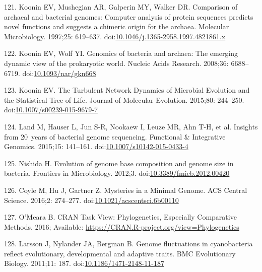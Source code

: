 \documentclass[12pt,twoside]{reedthesis}
\begin{document}
  \hypertarget{ref-kooninux5fcomparisonux5f1997}{}
  121. Koonin EV, Mushegian AR, Galperin MY, Walker DR. Comparison of
  archaeal and bacterial genomes: Computer analysis of protein sequences
  predicts novel functions and suggests a chimeric origin for the archaea.
  Molecular Microbiology. 1997;25: 619--637.
  doi:\href{https://doi.org/10.1046/j.1365-2958.1997.4821861.x}{10.1046/j.1365-2958.1997.4821861.x}
  
  \hypertarget{ref-kooninux5fgenomicsux5f2008}{}
  122. Koonin EV, Wolf YI. Genomics of bacteria and archaea: The emerging
  dynamic view of the prokaryotic world. Nucleic Acids Research. 2008;36:
  6688--6719.
  doi:\href{https://doi.org/10.1093/nar/gkn668}{10.1093/nar/gkn668}
  
  \hypertarget{ref-kooninux5fturbulentux5f2015}{}
  123. Koonin EV. The Turbulent Network Dynamics of Microbial Evolution
  and the Statistical Tree of Life. Journal of Molecular Evolution.
  2015;80: 244--250.
  doi:\href{https://doi.org/10.1007/s00239-015-9679-7}{10.1007/s00239-015-9679-7}
  
  \hypertarget{ref-landux5finsightsux5f2015}{}
  124. Land M, Hauser L, Jun S-R, Nookaew I, Leuze MR, Ahn T-H, et al.
  Insights from 20~years of bacterial genome sequencing. Functional \&
  Integrative Genomics. 2015;15: 141--161.
  doi:\href{https://doi.org/10.1007/s10142-015-0433-4}{10.1007/s10142-015-0433-4}
  
  \hypertarget{ref-nishidaux5fevolutionux5f2012}{}
  125. Nishida H. Evolution of genome base composition and genome size in
  bacteria. Frontiers in Microbiology. 2012;3.
  doi:\href{https://doi.org/10.3389/fmicb.2012.00420}{10.3389/fmicb.2012.00420}
  
  \hypertarget{ref-coyleux5fmysteriesux5f2016}{}
  126. Coyle M, Hu J, Gartner Z. Mysteries in a Minimal Genome. ACS
  Central Science. 2016;2: 274--277.
  doi:\href{https://doi.org/10.1021/acscentsci.6b00110}{10.1021/acscentsci.6b00110}
  
  \hypertarget{ref-omearaux5fcranux5f2016}{}
  127. O'Meara B. CRAN Task View: Phylogenetics, Especially Comparative
  Methods. 2016; Available:
  \url{https://CRAN.R-project.org/view=Phylogenetics}
  
  \hypertarget{ref-larssonux5fgenomeux5f2011}{}
  128. Larsson J, Nylander JA, Bergman B. Genome fluctuations in
  cyanobacteria reflect evolutionary, developmental and adaptive traits.
  BMC Evolutionary Biology. 2011;11: 187.
  doi:\href{https://doi.org/10.1186/1471-2148-11-187}{10.1186/1471-2148-11-187}
  
\end{document}
